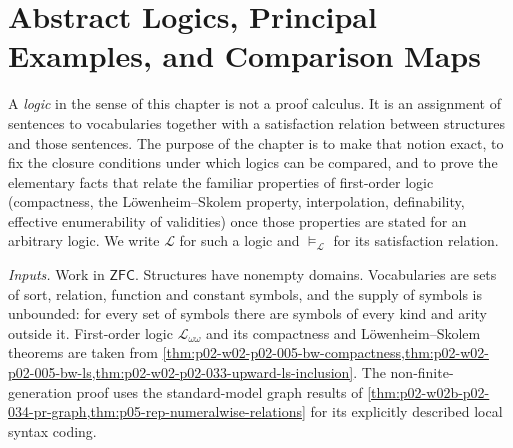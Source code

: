 \chapter{Abstract Logics, Principal Examples, and Comparison Maps}
\label{sec:p03-w03-p03-047-abstract-logics}

A \emph{logic} in the sense of this chapter is not a proof calculus.  It is
an assignment of sentences to vocabularies together with a satisfaction
relation between structures and those sentences.  The purpose of the
chapter is to make that notion exact, to fix the closure conditions under
which logics can be compared, and to prove the elementary facts that relate
the familiar properties of first-order logic (compactness, the
L\"owenheim--Skolem property, interpolation, definability, effective
enumerability of validities) once those properties are stated for an
arbitrary logic.  We write \(\mathscr L\) for such a logic and
\(\models_{\mathscr L}\) for its satisfaction relation.

\emph{Inputs.} Work in \(\mathsf{ZFC}\).  Structures have nonempty domains.
Vocabularies are sets of sort, relation, function and constant symbols, and
the supply of symbols is unbounded: for every set of symbols there are
symbols of every kind and arity outside it.  First-order logic
\(\mathscr L_{\omega\omega}\) and its compactness and L\"owenheim--Skolem
theorems are taken from \cref{thm:p02-w02-p02-005-bw-compactness,thm:p02-w02-p02-005-bw-ls,thm:p02-w02-p02-033-upward-ls-inclusion}.
The non-finite-generation proof uses the standard-model graph results of
\cref{thm:p02-w02b-p02-034-pr-graph,thm:p05-rep-numeralwise-relations}
for its explicitly described local syntax coding.


